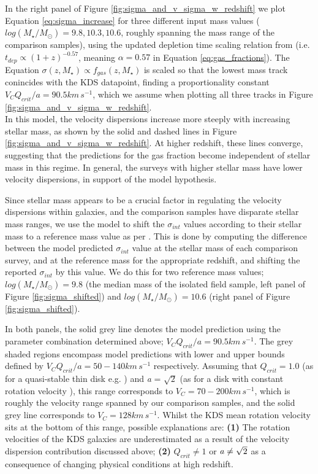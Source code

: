 \documentclass[fleqn,usenatbib]{mnras}
\begin{document}
In the right panel of Figure \ref{fig:sigma_and_v_sigma_w_redshift} we plot Equation \ref{eq:sigma_increase} for three different input mass values ($log(M_{\star}/M_{\odot})=9.8,10.3,10.6$, roughly spanning the mass range of the comparison samples), using the updated depletion time scaling relation from \cite{Tacconi2017} (i.e. $t_{dep} \propto (1 + z)^{-0.57}$, meaning $\alpha=0.57$ in Equation \ref{eq:gas_fractions}).
The Equation $\sigma(z,M_{\star})\propto f_{gas}(z,M_{\star})$ is scaled so that the lowest mass track conincides with the KDS datapoint, finding a proportionality constant $V_{C}Q_{crit}/a = 90.5km\,s^{-1}$, which we assume when plotting all three tracks in Figure \ref{fig:sigma_and_v_sigma_w_redshift}. \\

\noindent
In this model, the velocity dispersions increase more steeply with increasing stellar mass, as shown by the solid and dashed lines in Figure \ref{fig:sigma_and_v_sigma_w_redshift}.
At higher redshift, these lines converge, suggesting that the predictions for the gas fraction become independent of stellar mass in this regime.
In general, the surveys with higher stellar mass have lower velocity dispersions, in support of the model hypothesis.

Since stellar mass appears to be a crucial factor in regulating the velocity dispersions within galaxies, and the comparison samples have disparate stellar mass ranges, we use the model to shift the $\sigma_{int}$ values according to their stellar mass to a reference mass value as per \cite{Wisnioski2015}.
This is done by computing the difference between the model predicted $\sigma_{int}$ value at the stellar mass of each comparison survey, and at the reference mass for the appropriate redshift, and shifting the reported $\sigma_{int}$ by this value.
We do this for two reference mass values; $log(M_{\star}/M_{\odot}) = 9.8$ (the median mass of the isolated field sample, left panel of Figure \ref{fig:sigma_shifted}) and $log(M_{\star}/M_{\odot}) = 10.6$ (right panel of Figure \ref{fig:sigma_shifted}).

In both panels, the solid grey line denotes the model prediction using the parameter combination determined above; $V_{C}Q_{crit}/a = 90.5km\,s^{-1}$.
The grey shaded regions encompass model predictions with lower and upper bounds defined by $V_{C}Q_{crit}/a = 50-140km\,s^{-1}$ respectively.
Assuming that $Q_{crit} = 1.0$ (as for a quasi-stable thin disk e.g. \citealt{ForsterSchreiber2006,Burkert2010}) and {\it a} = $\sqrt{2}$ (as for a disk with constant rotation velocity \citealt{Wisnioski2015}), this range corresponds to $V_{C} = 70-200km\,s^{-1}$, which is roughly the velocity range spanned by our comparison samples, and the solid grey line corresponds to $V_{C} = 128km\,s^{-1}$.
Whilst the KDS mean rotation velocity sits at the bottom of this range, possible explanations are: \textbf{(1)} The rotation velocities of the KDS galaxies are underestimated as a result of the velocity dispersion contribution discussed above; \textbf{(2)} $Q_{crit} \ne 1$ or ${\it a} \ne \sqrt{2}$ as a consequence of changing physical conditions at high redshift. \\
\end{document}
